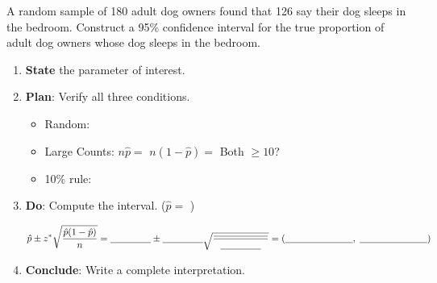 \documentclass[10pt]{article}
\begin{document}
\namedateperiod

\vspace{0.15in}

A random sample of 180 adult dog owners found that 126 say their dog sleeps in the bedroom.
Construct a 95\% confidence interval for the true proportion of adult dog owners whose dog
sleeps in the bedroom.

\begin{enumerate}
  \item \textbf{State} the parameter of interest.

  \item \textbf{Plan}: Verify all three conditions.
        \begin{itemize}
          \item Random: \blank{7cm}
          \item Large Counts: $n\hat p = $ \blank{2.5cm} \quad $n(1-\hat p) = $ \blank{2.5cm} \quad Both $\ge 10$? \blank{1cm}
          \item 10\% rule: \blank{6cm}
        \end{itemize}

  \item \textbf{Do}: Compute the interval. ($\hat p = $ \blank{2cm})

        \[
          \hat p \pm z^* \sqrt{\frac{\hat p(1-\hat p)}{n}}
          = \blank{1.5cm} \pm \blank{1.5cm}\sqrt{\frac{\blank{2cm}}{\blank{1.5cm}}}
          = (\blank{2.5cm},\; \blank{2.5cm})
        \]

  \item \textbf{Conclude}: Write a complete interpretation.
\end{enumerate}
\end{document}
